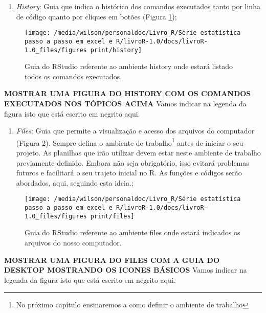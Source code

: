\documentclass[titlepage, oneside, openany, a4paper]{book}
\providecommand{\tightlist}{%
  \setlength{\itemsep}{0pt}\setlength{\parskip}{0pt}}
\begin{document}
\begin{enumerate}
\def\labelenumi{\arabic{enumi}.}
\setcounter{enumi}{3}
\tightlist
\item
  \emph{History}: Guia que indica o histórico dos comandos executados tanto por linha de código quanto por cliques em botões (Figura \ref{fig:history});
\end{enumerate}

\begin{figure}

{\centering \texttt{[image: /media/wilson/personaldoc/Livro\_R/Série estatística passo a passo em excel e R/livroR-1.0/docs/livroR-1.0\_files/figures print/history]} 

}

\caption{Guia do RStudio referente ao ambiente history onde estará listado todos os comandos executados.}\label{fig:history}
\end{figure}

\textbf{MOSTRAR UMA FIGURA DO HISTORY COM OS COMANDOS EXECUTADOS NOS TÓPICOS ACIMA} Vamos indicar na legenda da figura isto que está escrito em negrito aqui.

\begin{enumerate}
\def\labelenumi{\arabic{enumi}.}
\setcounter{enumi}{4}
\tightlist
\item
  \emph{Files}: Guia que permite a visualização e acesso dos arquivos do computador (Figura \ref{fig:files}). Sempre defina o ambiente de trabalho\footnote{No próximo capítulo ensinaremos a como definir o ambiente de trabalho} antes de iniciar o seu projeto. As planilhas que irão utilizar devem estar neste ambiente de trabalho previamente definido. Embora não seja obrigatório, isso evitará problemas futuros e facilitará o seu trajeto inicial no R. As funções e códigos serão abordados, aqui, seguindo esta ideia.;
\end{enumerate}

\begin{figure}

{\centering \texttt{[image: /media/wilson/personaldoc/Livro\_R/Série estatística passo a passo em excel e R/livroR-1.0/docs/livroR-1.0\_files/figures print/files]} 

}

\caption{Guia do RStudio referente ao ambiente files onde estará indicados os arquivos do nosso computador.}\label{fig:files}
\end{figure}

\textbf{MOSTRAR UMA FIGURA DO FILES COM A GUIA DO DESKTOP MOSTRANDO OS ICONES BÁSICOS} Vamos indicar na legenda da figura isto que está escrito em negrito aqui.
\end{document}
